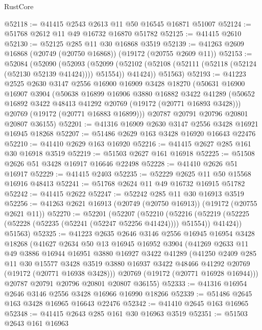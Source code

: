 \begin{lexlean}{RustCore}
\begin{coremodule}
@52118 := @41415 @2543 @2613 @11 @50 @16545 @16871 @51007
@52124 := @51768 @2612 @11 @49 @16732 @16870 @51782
@52125 := @41415 @2610
@52130 := @52125 @285 @11 @30 @16868 @3519
@52139 := @41263 @2609 @16868 (@20749 (@20750 @16868)) (@19172 (@20755 @2609 @11))
@52153 := @52084
    (@52090
      (@52093
        (@52099 (@52102 (@52108 (@52111 (@52118 (@52124 (@52130 @52139 @41424)))) @51554)) @41424))
      @51563)
@52193 := @41223
    @2525
    @2630
    @3147
    @2556
    @16900
    @16909
    @3428
    @18270
    (@50631
      @16900
      @16907
      @3904
      (@50638
        @16899
        @16906
        @3880
        @16882
        @3422
        @41289
        (@50652 @16892 @3422 @48413 @41292 @20769 (@19172 (@20771 @16893 @3428)))
        @20769
        (@19172 (@20771 @16883 @16899)))
      @20787
      @20791
      @20796
      @20801
      @20807
      @36155)
@52201 := @41316 @16909 @2630 @3147 @2556 @3428 @16921 @16945 @18268
@52207 := @51486 @2629 @163 @3428 @16920 @16643 @22476
@52210 := @41410 @2629 @163 @16920
@52216 := @41415 @2627 @285 @161 @30 @16918 @3519
@52219 := @51503 @2627 @161 @16918
@52225 := @51508 @2626 @51 @3428 @16917 @16646 @22498
@52228 := @41410 @2626 @51 @16917
@52229 := @41415 @2403
@52235 := @52229 @2625 @11 @50 @15568 @16916 @48413
@52241 := @51768 @2624 @11 @49 @16732 @16915 @51782
@52242 := @41415 @2622
@52247 := @52242 @285 @11 @30 @16913 @3519
@52256 := @41263 @2621 @16913 (@20749 (@20750 @16913)) (@19172 (@20755 @2621 @11))
@52270 := @52201
    (@52207
      (@52210
        (@52216 (@52219 (@52225 (@52228 (@52235 (@52241 (@52247 @52256 @41424)))) @51554)) @41424))
      @51563)
@52325 := @41223
    @2635
    @2646
    @3146
    @2556
    @16945
    @16954
    @3428
    @18268
    (@41627
      @2634
      @50
      @13
      @16945
      @16952
      @3904
      (@41269
        @2633
        @11
        @49
        @3886
        @16944
        @16951
        @3880
        @16927
        @3422
        @41289
        (@41250
          @2409
          @285
          @11
          @30
          @15577
          @3428
          @3519
          @3880
          @16937
          @3422
          @48466
          @41292
          @20769
          (@19172 (@20771 @16938 @3428)))
        @20769
        (@19172 (@20771 @16928 @16944)))
      @20787
      @20791
      @20796
      @20801
      @20807
      @36155)
@52333 := @41316 @16954 @2646 @3146 @2556 @3428 @16966 @16990 @18266
@52339 := @51486 @2645 @163 @3428 @16965 @16643 @22476
@52342 := @41410 @2645 @163 @16965
@52348 := @41415 @2643 @285 @161 @30 @16963 @3519
@52351 := @51503 @2643 @161 @16963

\end{coremodule}
\end{lexlean}

